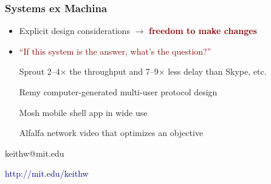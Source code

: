 \documentclass[svgnames]{beamer}
\begin{document}
\begin{frame}

\frametitle{Systems ex Machina}

\begin{itemize}

\item Explicit design considerations $\rightarrow$ \textbf{\textcolor{Maroon}{freedom to make changes}}

\item \textcolor{Maroon}{``If this system is the answer, what's the question?''}

\item[]

\item[Sprout] 2--4$\times$ the throughput and 7--9$\times$ less delay than Skype, etc.

\item[Remy] computer-generated multi-user protocol design

\item[Mosh] mobile shell app in wide use

\item[Alfalfa] network video that optimizes an objective

\end{itemize}

\vspace{\baselineskip}

\begin{centering}
keithw@mit.edu

\vspace{7 pt}

\textcolor{DarkBlue}{http://mit.edu/keithw}

\end{centering}

\end{frame}
\end{document}
